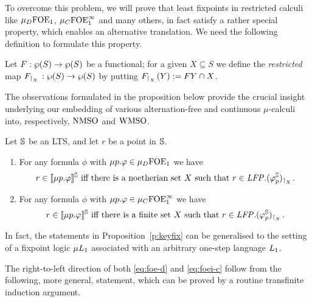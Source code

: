 To overcome this problem, we will prove that least fixpoints in restricted 
calculi like $\mu_{D}\mathrm{FOE}_1$, $\mu_{C}\mathrm{FOE}^{\infty}_1$ and many others, in fact satisfy a
rather special property, which enables an alternative translation.
We need the following definition to formulate this property.

\begin{definition}
\label{d:rst}
Let $F: \wp(S)\to \wp(S)$ be a functional; for a given $X \subseteq S$ we define
the \emph{restricted} map $F_{{\upharpoonright}_{X}\,}: \wp(S)\to \wp(S)$ by putting 
$F_{{\upharpoonright}_{X}\,}(Y) \mathrel{:=} FY \cap X$.
\end{definition}

The observations formulated in the proposition below provide the crucial insight
underlying our embedding of various alternation-free and continuous 
$\mu$-calculi into, respectively, $\mathrm{NMSO}$ and $\mathrm{WMSO}$.

\begin{proposition}
\label{p:afmc-rstGen}
\label{p:keyfix}
Let $\mathbb{S}$ be an LTS, and let $r$ be a point in $\mathbb{S}$.
\begin{enumerate}[(1)]
\item
 For any formula $\phi$ with $\mu p. \varphi \in \mu_{D}\mathrm{FOE}_1$ we have
\begin{equation}
\label{eq:foe-d}
r \in \ext{\mu p.\phi}^{\bbS} \text{ iff there is a noetherian set $X$ such 
that } r \in \LFP. (\phi^{\bbS}_{p})_{\rst{X}}.
\end{equation}

\item
For any formula $\phi$ with $\mu p. \varphi \in \mu_{C}\mathrm{FOE}^{\infty}_1$ we have
\begin{equation}
\label{eq:foei-c}
r \in \ext{\mu p.\phi}^{\bbS} \text{ iff there is a finite set $X$ such 
that } r \in \LFP. (\phi^{\bbS}_{p})_{\rst{X}}.
\end{equation}
\end{enumerate}
\end{proposition}

\begin{remark}
In fact, the statements in Proposition~\ref{p:keyfix} can be generalised to the
setting of a fixpoint logic $\mu L_{1}$ associated with an arbitrary one-step 
language $L_{1}$.
\end{remark}

The right-to-left direction of both \eqref{eq:foe-d} and \eqref{eq:foei-c} follow
from the following, more general, statement, which can be proved by a routine 
transfinite induction argument.

